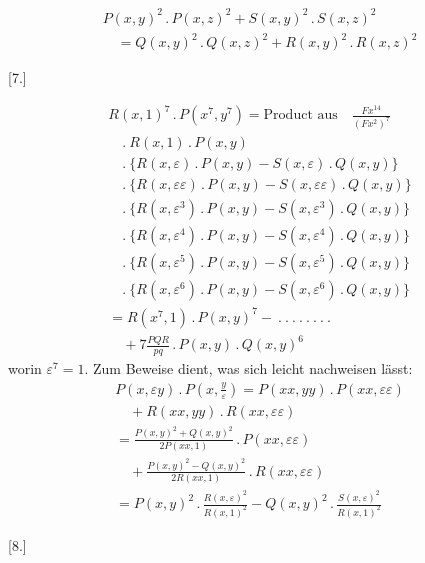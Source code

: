 \[
\begin{gathered}P(x,y)^2\,.\,P(x,z)^2+S(x,y)^2\,.\,S(x,z)^2
\\[8pt]\quad{}=Q(x,y)^2\,.\,Q(x,z)^2+R(x,y)^2\,.\,R(x,z)^2\end{gathered}
\]

\par\medskip{}\centerline{[7.]}\nobreak\smallskip
\[
\begin{gathered}
R(x,1)^7\,.\,P(x^7,y^7)=\text{Product aus}\quad\frac{Fx^{14}}{(Fx^2)^7}\\[8pt]
\quad .\ R(x,1)\,.\,P(x,y)\\[8pt]
\quad .\ \{R(x,\varepsilon)\,.\,P(x,y)-S(x,\varepsilon)\,.\,Q(x,y)\}\\[8pt]
\quad .\ \{R(x,\varepsilon\varepsilon)\,.\,P(x,y)-S(x,\varepsilon\varepsilon)\,.\,Q(x,y)\}\\[8pt]
\quad .\ \{R(x,\varepsilon^3)\,.\,P(x,y)-S(x,\varepsilon^3)\,.\,Q(x,y)\}\\[8pt]
\quad .\ \{R(x,\varepsilon^4)\,.\,P(x,y)-S(x,\varepsilon^4)\,.\,Q(x,y)\}\\[8pt]
\quad .\ \{R(x,\varepsilon^5)\,.\,P(x,y)-S(x,\varepsilon^5)\,.\,Q(x,y)\}\\[8pt]
\quad .\ \{R(x,\varepsilon^6)\,.\,P(x,y)-S(x,\varepsilon^6)\,.\,Q(x,y)\}\\[8pt]
=R(x^7,1)\,.\,P(x,y)^7-\ .\ .\ .\ .\ .\ .\ .\ .\ \\[8pt]\quad{}+7\frac{PQR}{pq}\,.\,P(x,y)\,.\,Q(x,y)^6
\end{gathered}
\]
worin $\varepsilon^7=1$. Zum Beweise dient, was sich leicht nachweisen lässt:
\[
\begin{gathered}
P(x,\varepsilon y)\,.\,P(x,\tfrac{y}{\varepsilon})
=P(xx,yy)\,.\,P(xx,\varepsilon\varepsilon)\\[8pt]\quad{}+R(xx,yy)\,.\,R(xx,\varepsilon\varepsilon)\\[8pt]
=\frac{P(x,y)^2+Q(x,y)^2}{2P(xx,1)}\,.\,P(xx,\varepsilon\varepsilon)
\\[8pt]\quad{}+\frac{P(x,y)^2-Q(x,y)^2}{2R(xx,1)}\,.\,R(xx,\varepsilon\varepsilon)\\[8pt]
=P(x,y)^2\,.\,\frac{R(x,\varepsilon)^2}{R(x,1)^2}
-Q(x,y)^2\,.\,\frac{S(x,\varepsilon)^2}{R(x,1)^2}
\end{gathered}
\]
\par\medskip{}\centerline{[8.]}\nobreak\smallskip
